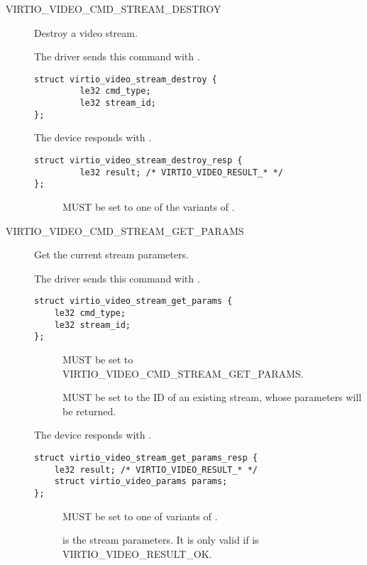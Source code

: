 \begin{description}
\item[VIRTIO_VIDEO_CMD_STREAM_DESTROY] Destroy a video stream.

The driver sends this command with .
\begin{lstlisting}
struct virtio_video_stream_destroy {
         le32 cmd_type;
         le32 stream_id;
};
\end{lstlisting}

The device responds with .
\begin{lstlisting}
struct virtio_video_stream_destroy_resp {
         le32 result; /* VIRTIO_VIDEO_RESULT_* */
};
\end{lstlisting}
\begin{description}
\item[] MUST be set to one of the variants of .
\end{description}

\item[VIRTIO_VIDEO_CMD_STREAM_GET_PARAMS] Get the current stream parameters.

The driver sends this command with .
\begin{lstlisting}
struct virtio_video_stream_get_params {
    le32 cmd_type;
    le32 stream_id;
};
\end{lstlisting}
\begin{description}
\item[] MUST be set to VIRTIO_VIDEO_CMD_STREAM_GET_PARAMS.
\item[] MUST be set to the ID of an existing stream, whose
  parameters will be returned.
\end{description}

The device responds with .
\begin{lstlisting}
struct virtio_video_stream_get_params_resp {
    le32 result; /* VIRTIO_VIDEO_RESULT_* */
    struct virtio_video_params params;
};
\end{lstlisting}
\begin{description}
\item[] MUST be set to one of variants of .
\item[] is the stream parameters. It is only valid if
   is VIRTIO_VIDEO_RESULT_OK.
\end{description}


\end{description}
